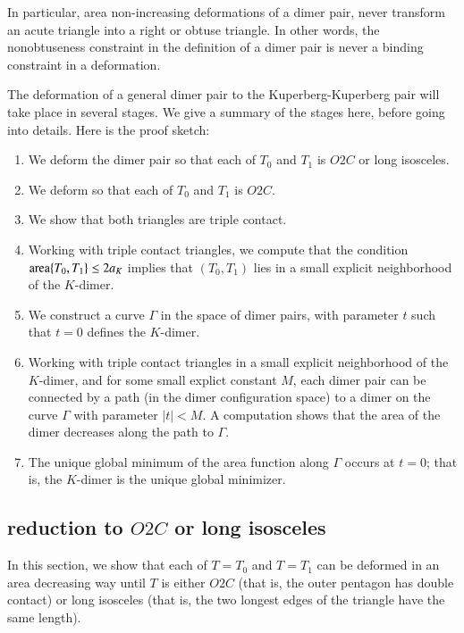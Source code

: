 In particular, area non-increasing deformations of a dimer pair, never transform an acute
triangle into a right or obtuse triangle.  In other words, the nonobtuseness constraint in the
definition of a dimer pair is never a binding constraint in a deformation.

The deformation of a general dimer pair to the Kuperberg-Kuperberg pair will take place in several
stages.  We give a summary of the stages here, before going into details.  Here is the proof sketch:

\begin{enumerate}
\item We deform the dimer pair so that each of $T_0$ and $T_1$ is $O2C$
or long isosceles.
\item We deform so that each of $T_0$ and $T_1$ is $O2C$.
\item We show that both triangles are triple contact.
\item Working with triple contact triangles, 
we compute that the condition ${\operatorname{area}}\{T_0,T_1\}\le 2a_K$ implies that
$(T_0,T_1)$ lies in a small explicit neighborhood of the $K$-dimer.
\item We construct a curve $\Gamma$ in the space of dimer pairs, with parameter $t$
such that $t=0$ defines the $K$-dimer.
\item Working with triple contact triangles in a small explicit neighborhood of the
$K$-dimer, and for some small explict constant $M$,
each dimer pair can be connected by a path (in the dimer configuration
space) to a dimer on the curve $\Gamma$ with parameter $|t|<M$.
A computation shows that the area of the dimer decreases along the path to $\Gamma$.  
\item The unique global minimum of the area function along $\Gamma$ occurs at $t=0$;
that is, the $K$-dimer is the unique global minimizer.
\end{enumerate}

\subsection{reduction to $O2C$ or long isosceles}



In this section, we show that each of $T=T_0$ and $T=T_1$ can be deformed in an area
decreasing way until $T$ is either $O2C$ (that is, the outer pentagon has double contact)
or long isosceles (that is, the two longest edges of the triangle have the same length).


